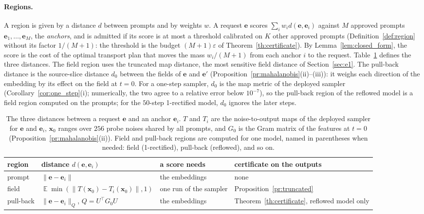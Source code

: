\documentclass{article}
\DeclareMathOperator{\E}{\mathbb{E}}
\newcommand{\bx}{\mathbf{x}}
\newcommand{\be}{\mathbf{e}}
\theoremstyle{plain}
\theoremstyle{remark}
\begin{document}
\paragraph{Regions.}
A region is given by a distance $d$ between prompts and by weights $w$. A request $\be$ scores $\sum_iw_id(\be,\be_i)$ against $M$
approved prompts $\be_1,\dots,\be_M$, the \emph{anchors}, and is admitted if its score is at most a threshold calibrated on $K$ other
approved prompts (Definition~\ref{def:region} without its factor $1/(M+1)$: the threshold is the budget $(M+1)\varepsilon$ of
Theorem~\ref{th:certificate}). By Lemma~\ref{lem:closed_form}, the score is the cost of the optimal transport plan that moves the mass
$w_i/(M+1)$ from each anchor $i$ to the request. Table~\ref{tab:e2_regions} defines the three distances. The field region uses the
truncated map distance, the most sensitive field distance of Section~\ref{sec:e1}. The pull-back distance is the source-slice
distance $d_0$ between the fields of $\be$ and $\be'$ (Proposition~\ref{pr:mahalanobis}(ii)--(iii)): it weighs each direction of the
embedding by its effect on the field at $t=0$. For a one-step sampler, $d_0$ is the map metric of the deployed sampler
(Corollary~\ref{cor:one_step}(i); numerically, the two agree to a relative error below $10^{-7}$), so the pull-back region of the
reflowed model is a field region computed on the prompts; for the $50$-step 1-rectified model, $d_0$ ignores the later steps.

\begin{table}[!htbp]
\centering
\caption{The three distances between a request $\be$ and an anchor $\be_i$. $T$ and $T_i$ are the noise-to-output maps of the
deployed sampler for $\be$ and $\be_i$, $\bx_0$ ranges over $256$ probe noises shared by all prompts, and $G_0$ is the Gram matrix of
the features at $t=0$ (Proposition~\ref{pr:mahalanobis}(ii)). Field and pull-back regions are computed for one model, named in
parentheses when needed: field (1-rectified), pull-back (reflowed), and so on.}
\label{tab:e2_regions}
\small
\begin{tabular}{l l l l}
\toprule
region & distance $d(\be,\be_i)$ & a score needs & certificate on the outputs\\
\midrule
prompt & $\|\be-\be_i\|$ & the embeddings & none\\
field & $\E\min(\|T(\bx_0)-T_i(\bx_0)\|,1)$ & one run of the sampler & Proposition~\ref{pr:truncated}\\
pull-back & $\|\be-\be_i\|_Q$, $Q=U^\top G_0U$ & the embeddings & Theorem~\ref{th:certificate}, reflowed model only\\
\bottomrule
\end{tabular}
\end{table}
\end{document}
